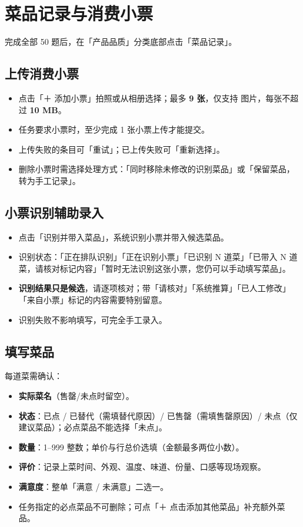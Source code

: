 \documentclass[12pt,a4paper,fontset=none]{ctexart}
\begin{document}
\section{菜品记录与消费小票}

完成全部 50 题后，在「产品品质」分类底部点击「菜品记录」。

\subsection{上传消费小票}
\begin{itemize}
\item 点击「＋ 添加小票」拍照或从相册选择；最多 \textbf{9 张}，仅支持 图片，每张不超过 \textbf{10 MB}。
\item 任务要求小票时，至少完成 1 张小票上传才能提交。
\item 上传失败的条目可「重试」；已上传失败可「重新选择」。
\item 删除小票时需选择处理方式：「同时移除未修改的识别菜品」或「保留菜品，转为手工记录」。
\end{itemize}

\subsection{小票识别辅助录入}
\begin{itemize}
\item 点击「识别并带入菜品」，系统识别小票并带入候选菜品。
\item 识别状态：「正在排队识别」「正在识别小票」「已识别 N 道菜」「已带入 N 道菜，请核对标记内容」「暂时无法识别这张小票，您仍可以手动填写菜品」。
\item \textbf{识别结果只是候选}，请逐项核对；带「请核对」「系统推算」「已人工修改」「来自小票」标记的内容需要特别留意。
\item 识别失败不影响填写，可完全手工录入。
\end{itemize}

\subsection{填写菜品}
每道菜需确认：
\begin{itemize}
\item \textbf{实际菜名}（售罄/未点时留空）。
\item \textbf{状态}：已点 / 已替代（需填替代原因）/ 已售罄（需填售罄原因）/ 未点（仅建议菜品）；必点菜品不能选择「未点」。
\item \textbf{数量}：1–999 整数；单价与行总价选填（金额最多两位小数）。
\item \textbf{评价}：记录上菜时间、外观、温度、味道、份量、口感等现场观察。
\item \textbf{满意度}：整单「满意 / 未满意」二选一。
\item 任务指定的必点菜品不可删除；可点「＋ 点击添加其他菜品」补充额外菜品。
\end{itemize}
\end{document}
